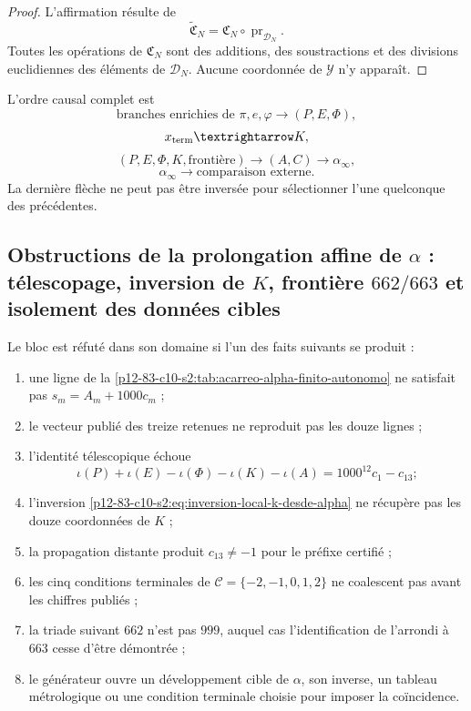 \begin{proof}
L’affirmation résulte de
\[
 \widetilde{\mathfrak C}_N
 =\mathfrak C_N\circ\operatorname{pr}_{\mathscr D_N}.
\]
Toutes les opérations de \(\mathfrak C_N\) sont des additions, des soustractions et des divisions
euclidiennes des éléments de \(\mathscr D_N\). Aucune coordonnée de
\(\mathscr Y\) n’y apparaît.
\end{proof}

L’ordre causal complet est
\[
 \text{branches enrichies de }\pi,e,\varphi
 \longrightarrow(P,E,\Phi),
\]
\[
 x_{\rm term}\longrightarrow K,
\]
\[
 (P,E,\Phi,K,\text{frontière})
 \longrightarrow(A,C)
 \longrightarrow\alpha_\infty,
\]
\[
 \alpha_\infty
 \longrightarrow\text{comparaison externe}.
\]
La dernière flèche ne peut pas être inversée pour sélectionner l’une quelconque des
précédentes.

\subsection{Obstructions de la prolongation affine de \(\alpha\) : télescopage, inversion de \(K\), frontière \(662/663\) et isolement des données cibles}

\begin{criterion}
Le bloc est réfuté dans son domaine si l'un des faits
suivants se produit :
\begin{enumerate}
 \item une ligne de la \cref{p12-83-c10-s2:tab:acarreo-alpha-finito-autonomo}
       ne satisfait pas \(s_m=A_m+1000c_m\) ;
 \item le vecteur publié des treize retenues ne reproduit pas les douze lignes ;
 \item l’identité télescopique échoue
       \[
       \iota(P)+\iota(E)-\iota(\Phi)-\iota(K)-\iota(A)
       =1000^{12}c_1-c_{13};
       \]
 \item l’inversion \eqref{p12-83-c10-s2:eq:inversion-local-k-desde-alpha} ne récupère pas
       les douze coordonnées de \(K\) ;
 \item la propagation distante produit \(c_{13}\neq-1\) pour le préfixe
       certifié ;
 \item les cinq conditions terminales de
       \(\mathcal C=\{-2,-1,0,1,2\}\) ne coalescent pas avant les chiffres
       publiés ;
 \item la triade suivant \(662\) n’est pas \(999\), auquel cas l’identification
       de l’arrondi à \(663\) cesse d’être démontrée ;
 \item le générateur ouvre un développement cible de \(\alpha\), son inverse,
       un tableau métrologique ou une condition terminale choisie pour imposer
       la coïncidence.
\end{enumerate}
\end{criterion}

